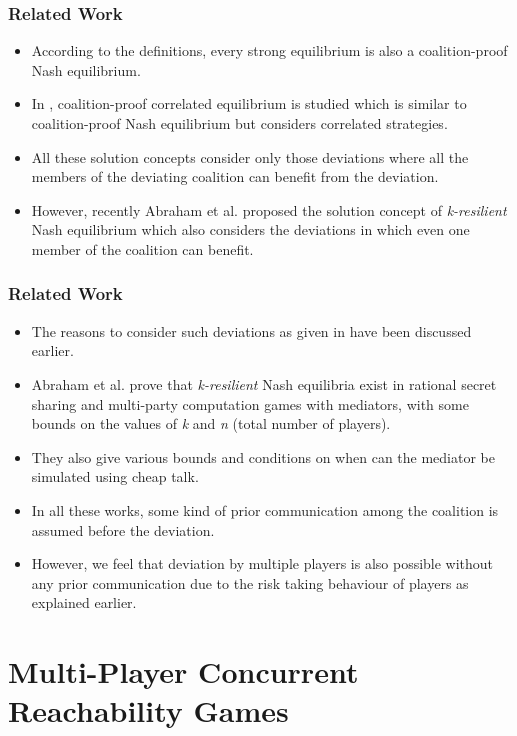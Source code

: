 \documentclass{beamer}
\begin{document}
\begin{frame}
\frametitle{Related Work}
  \begin{itemize}
	\item According to the definitions, every strong equilibrium is also a coalition-proof Nash equilibrium.
 	\item In \cite{Moreno-1996}, coalition-proof correlated equilibrium is studied which is similar to coalition-proof Nash equilibrium but considers correlated strategies.
 	\item All these solution concepts consider only those deviations where all the members of the deviating coalition can benefit from the deviation.
  	\item However, recently Abraham et al. \cite{Abraham-2006,Abraham-2008} proposed the solution concept of \textit{k-resilient} Nash equilibrium which also considers the deviations in which even one member of the coalition can benefit.
  \end{itemize}
\end{frame}

\begin{frame}
\frametitle{Related Work}
  \begin{itemize}
    \item The reasons to consider such deviations as given in \cite{Abraham-2006} have been discussed earlier.
    \item Abraham et al. \cite{Abraham-2006,Abraham-2008} prove that \textit{k-resilient} Nash equilibria exist in rational secret sharing and multi-party computation games with mediators, with some bounds on the values of \textit{k} and \textit{n} (total number of players).
  	\item They also give various bounds and conditions on when can the mediator be simulated using cheap talk.
  	\item In all these works, some kind of prior communication among the coalition is assumed before the deviation.
  	\item However, we feel that deviation by multiple players is also possible without any prior communication due to the risk taking behaviour of players as explained earlier.
  \end{itemize}
\end{frame}

\section[Multi-Player Concurrent Reachability Games]{Multi-Player Concurrent Reachability Games}
\end{document}
